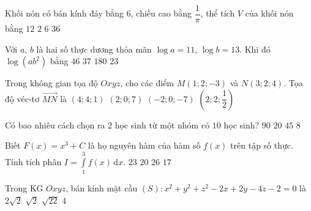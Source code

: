 \begin{ex}%
	Khối nón có bán kính đáy bằng $6$, chiều cao bằng $\dfrac{1}{\pi}$, thể tích $V$ của khối nón bằng
	\choice
	{\True $12$}
	{$2$}
	{$6$}
	{$36$}
\end{ex}
\begin{ex}%
	Với $a$, $b$ là hai số thực dương thỏa mãn $\log a=11$, $\log b=13$. Khi đó $\log\left(ab^2\right)$ bằng
	\choice
	{$46$}
	{\True $37$}
	{$180$}
	{$23$}
\end{ex}
\begin{ex}%
	Trong không gian tọa độ $Oxyz$, cho các điểm $M(1;2;-3)$ và $N(3;2;4)$. Tọa độ véc-tơ $\overrightarrow{MN}$ là
	\choice
	{$(4;4;1)$}
	{\True $(2;0;7)$}
	{$(-2;0;-7)$}
	{$\left(2;2;\dfrac{1}{2}\right)$}
\end{ex}
\begin{ex}%
	Có bao nhiêu cách chọn ra $2$ học sinh từ một nhóm có $10$ học sinh?
	\choice
	{$90$}
	{$20$}
	{\True $45$}
	{$8$}
\end{ex}
\begin{ex}%
	Biết $F(x)=x^3+C$ là họ nguyên hàm của hàm số $f(x)$ trên tập số thực. Tính tích phân $I=\displaystyle\int\limits_1^3f(x)\mathrm{\,d}x$.
	\choice
	{$23$}
	{$20$}
	{\True $26$}
	{$17$}
\end{ex}
\begin{ex}%
	Trong KG $Oxyz$, bán kính mặt cầu $(S)\colon x^2+y^2+z^2-2x+2y-4z-2=0$ là
	\choice
	{\True $2\sqrt{2}$}
	{$\sqrt{2}$}
	{$\sqrt{22}$}
	{$4$}
\end{ex}
